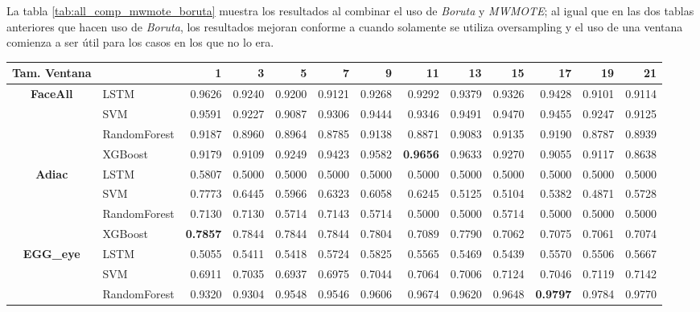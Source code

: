 La tabla \ref{tab:all_comp_mwmote_boruta} muestra los resultados al combinar el uso de \textit{Boruta} y \textit{MWMOTE}; al igual que en las dos tablas anteriores que hacen uso de \textit{Boruta}, los resultados mejoran conforme a cuando solamente se utiliza oversampling y el uso de una ventana comienza a ser útil para los casos en los que no lo era.

\begin{table}[h]
\centering
\begin{adjustbox}{max width=15cm}
\begin{tabular}{|c|l|r|r|r|r|r|r|r|r|r|r|r|}
		\hline
		\textbf{Tam. Ventana}&         &      1  &      3  &      5  &      7  &      9  &      11 &      13 &      15 &      17 &      19 &      21 \\
		\hline
		\textbf{FaceAll} & LSTM &  0.9626 &  0.9240 &  0.9200 &  0.9121 &  0.9268 &  0.9292 &  0.9379 &  0.9326 &  0.9428 &  0.9101 &  0.9114 \\
		& SVM &  0.9591 &  0.9227 &  0.9087 &  0.9306 &  0.9444 &  0.9346 &  0.9491 &  0.9470 &  0.9455 &  0.9247 &  0.9125 \\
		& RandomForest &  0.9187 &  0.8960 &  0.8964 &  0.8785 &  0.9138 &  0.8871 &  0.9083 &  0.9135 &  0.9190 &  0.8787 &  0.8939 \\
		& XGBoost &  0.9179 &  0.9109 &  0.9249 &  0.9423 &  0.9582 &  \textbf{0.9656} &  0.9633 &  0.9270 &  0.9055 &  0.9117 &  0.8638 \\
		\hline
		\textbf{Adiac} & LSTM &  0.5807 &  0.5000 &  0.5000 &  0.5000 &  0.5000 &  0.5000 &  0.5000 &  0.5000 &  0.5000 &  0.5000 &  0.5000 \\
		& SVM &  0.7773 &  0.6445 &  0.5966 &  0.6323 &  0.6058 &  0.6245 &  0.5125 &  0.5104 &  0.5382 &  0.4871 &  0.5728 \\
		& RandomForest &  0.7130 &  0.7130 &  0.5714 &  0.7143 &  0.5714 &  0.5000 &  0.5000 &  0.5714 &  0.5000 &  0.5000 &  0.5000 \\
		& XGBoost &  \textbf{0.7857} &  0.7844 &  0.7844 &  0.7844 &  0.7804 &  0.7089 &  0.7790 &  0.7062 &  0.7075 &  0.7061 &  0.7074 \\
		\hline
		\textbf{EGG\_eye} & LSTM &  0.5055 &  0.5411 &  0.5418 &  0.5724 &  0.5825 &  0.5565 &  0.5469 &  0.5439 &  0.5570 &  0.5506 &  0.5667 \\
		& SVM &  0.6911 &  0.7035 &  0.6937 &  0.6975 &  0.7044 &  0.7064 &  0.7006 &  0.7124 &  0.7046 &  0.7119 &  0.7142 \\
		& RandomForest &  0.9320 &  0.9304 &  0.9548 &  0.9546 &  0.9606 &  0.9674 &  0.9620 &  0.9648 &  \textbf{0.9797} &  0.9784 &  0.9770 \\

\end{tabular}
\end{adjustbox}
\end{table}
